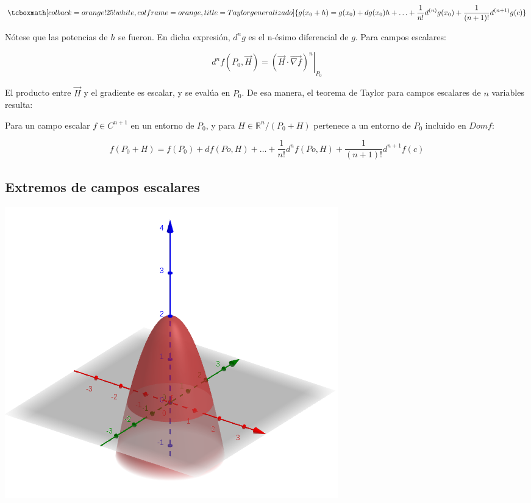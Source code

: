 \documentclass{article}
\renewcommand{\Bbb}{\mathbb}
\begin{document}
\begin{equation}
\tcboxmath[colback=orange!25!white,colframe=orange, title=Taylor generalizado]
{ g(x_0 + h) = g(x_0) + dg(x_0) h + \ldots + \frac{1}{n!} d^{(n)}g(x_0) +  \frac{1}{(n+1)!} d^{(n+1)}g(c) }
\end{equation}

Nótese que las potencias de $h$ se fueron. En dicha expresión, $d^ng$ es el n-ésimo diferencial de $g$. Para campos escalares:

\begin{equation}
d^{n}f(P_0, \overrightarrow{H}) = \left. (\overrightarrow{H} \cdot \overrightarrow{\nabla f})^n \right|_{P_0}
\end{equation}

El producto entre $\overrightarrow{H}$ y el gradiente es escalar, y se evalúa en $P_0$. De esa manera, el teorema de Taylor para campos escalares de $n$ variables resulta:

Para un campo escalar $f \in C^{n+1}$ en un entorno de $P_0$, y para $H \in \Bbb R^n/ (P_0+ H)$ pertenece a un entorno de $P_0$ incluido en $Dom f$:

\begin{equation}
f(P_0+H) = f(P_0) + df(Po, H) + \ldots + \frac{1}{n!} d^nf(Po,H) + \frac{1}{(n+1)!} d^{n+1}f(c)
\end{equation}

\subsection{Extremos de campos escalares}

\noindent
\begin{minipage}{\textwidth}
\centering
{}
\includegraphics[scale=0.6]{img/teo_fig010_exce01.png} 
\label{fig:exce01}
\end{minipage}
\end{document}
